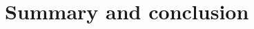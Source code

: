 \chapter{Summary and conclusion}
\label{chap:conclusion}

\begin{comment}
TODO: Write the story of the conclusion chapter

TODO: Write the conclusion chapter section outline

TODO: Add all the sections below
\end{comment}